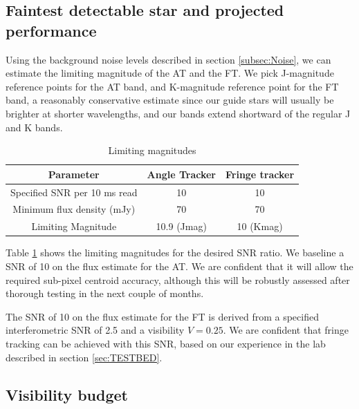 \subsection{Faintest detectable star and projected performance}\label{subsec:FAINTEST}
Using the background noise levels described in section \ref{subsec:Noise}, we can estimate the limiting magnitude of the AT and the FT. We pick J-magnitude reference points for the AT band, and K-magnitude reference point for the FT band, a reasonably conservative estimate since our guide stars will usually be brighter at shorter wavelengths, and our bands extend shortward of the regular J and K bands.

\begin{table}[!ht]
\begin{center}
\caption{Limiting magnitudes }
\label{tb:LimMag}
\begin{tabular}{|c||c|c|}
\hline 
Parameter & Angle Tracker & Fringe tracker \\ 
\hline 
\hline
Specified SNR per 10 ms read & 10 & 10 \\ 
\hline 
Minimum flux density (mJy) & 70 & 70 \\ 
\hline 
Limiting Magnitude & 10.9 (Jmag) & 10 (Kmag)\\ 
\hline 
\end{tabular} 
\end{center}
\end{table}

Table \ref{tb:LimMag} shows the limiting magnitudes for the desired SNR ratio. We baseline a SNR of 10 on the flux estimate for the AT. We are confident that it will allow the required sub-pixel centroid accuracy, although this will be robustly assessed after thorough testing in the next couple of months.


The SNR of 10 on the flux estimate for the FT is derived from a specified interferometric SNR of 2.5 and a visibility $V=0.25$. We are confident that fringe tracking can be achieved with this SNR, based on our experience in the lab described in section \ref{sec:TESTBED}.

\subsection{Visibility budget}\label{subsec:VIS}

